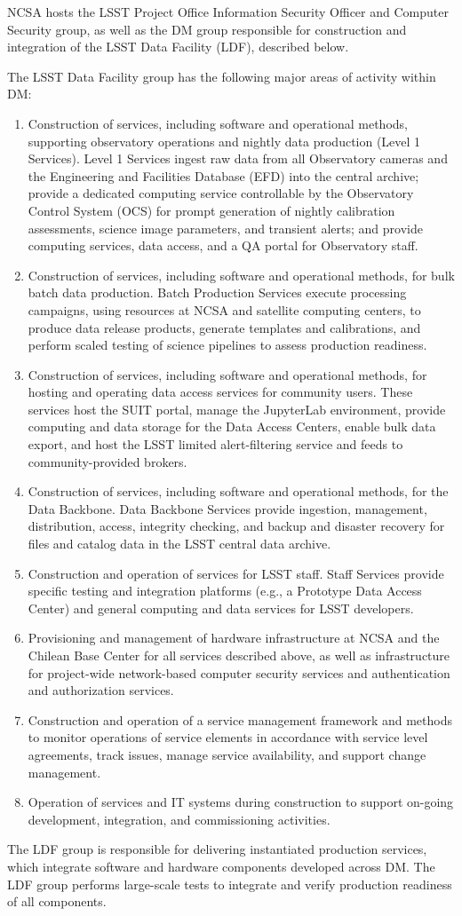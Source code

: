 NCSA hosts the LSST Project Office Information Security Officer and Computer Security group, as well as the DM group responsible for construction and integration of the LSST Data Facility (LDF), described below.

The LSST Data Facility group has the following major areas of activity within DM:
\begin{enumerate}
	\item	Construction of services, including software and operational methods, supporting observatory operations and nightly data production (Level 1 Services). Level 1 Services ingest raw data from all Observatory cameras and the Engineering and Facilities Database (EFD) into the central archive; provide a dedicated computing service controllable by the Observatory Control System (OCS) for prompt generation of nightly calibration assessments, science image parameters, and transient alerts; and provide computing services, data access, and a QA portal for Observatory staff.
	\item	Construction of services, including software and operational methods, for bulk batch data production. Batch Production Services execute processing campaigns, using resources at NCSA and satellite computing centers, to produce data release products, generate templates and calibrations, and perform scaled testing of science pipelines to assess production readiness.
	\item	Construction of services, including software and operational methods, for hosting and operating data access services for community users. These services host the SUIT portal, manage the JupyterLab environment, provide computing and data storage for the Data Access Centers, enable bulk data export, and host the LSST limited alert-filtering service and feeds to community-provided brokers.
	\item	Construction of services, including software and operational methods, for the Data Backbone. Data Backbone Services provide ingestion, management, distribution, access, integrity checking, and backup and disaster recovery for files and catalog data in the LSST central data archive.
	\item	Construction and operation of services for LSST staff. Staff Services provide specific testing and integration platforms (e.g., a Prototype Data Access Center) and general computing and data services for LSST developers.
	\item	Provisioning and management of hardware infrastructure at NCSA and the Chilean Base Center for all services described above, as well as infrastructure for project-wide network-based computer security services and authentication and authorization services.
	\item	Construction and operation of a service management framework and methods to monitor operations of service elements in accordance with service level agreements, track issues, manage service availability, and support change management.
	\item	Operation of services and IT systems during construction to support on-going development, integration, and commissioning activities.
\end{enumerate}
The LDF group is responsible for delivering instantiated production services, which integrate software and hardware components developed across DM. The LDF group performs large-scale tests to integrate and verify production readiness of all components.
